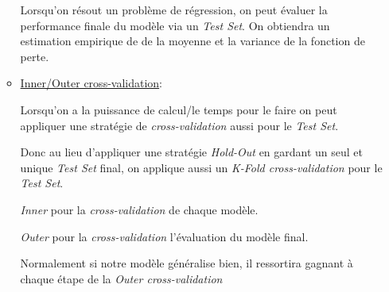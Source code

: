 \documentclass{article}
\begin{document}
\begin{enumerate}
\begin{itemize}
        Lorsqu'on résout un problème de régression, on peut évaluer la
        performance finale du modèle via un \emph{Test Set}. On obtiendra un
        estimation empirique de de la moyenne et la variance de la fonction de perte.

     
      \item \underline{Inner/Outer cross-validation}:

        Lorsqu'on a la puissance de calcul/le temps pour le faire on peut appliquer une
        stratégie de \emph{cross-validation} aussi pour le \emph{Test Set}.

        Donc au lieu d'appliquer une stratégie \emph{Hold-Out} en gardant un
        seul et unique \emph{Test Set} final, on applique aussi un \emph{K-Fold
          cross-validation} pour le \emph{Test Set}.

        \emph{Inner} pour la \emph{cross-validation} de chaque modèle.

        \emph{Outer} pour la \emph{cross-validation} l'évaluation du modèle final.

        Normalement si notre modèle généralise bien, il ressortira gagnant à
        chaque étape de la \emph{Outer cross-validation}
    \end{itemize}
    
\end{enumerate}
\end{document}
